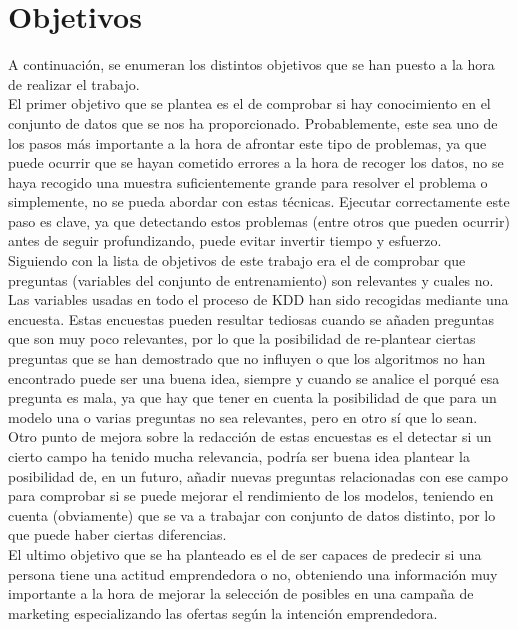 \section{Objetivos}
\label{sec:obj}
A continuación, se enumeran los distintos objetivos que se han puesto a la hora de realizar el trabajo. \\
\linebreak
El primer objetivo que se plantea es el de comprobar si hay conocimiento en el conjunto de datos que se nos ha proporcionado. Probablemente, este sea uno de los pasos más importante a la hora de afrontar este tipo de problemas, ya que puede ocurrir que se hayan cometido errores a la hora de recoger los datos, no se haya recogido una muestra suficientemente grande para resolver el problema o simplemente, no se pueda abordar con estas técnicas. Ejecutar correctamente este paso es clave, ya que detectando estos problemas (entre otros que pueden ocurrir) antes de seguir profundizando, puede evitar invertir tiempo y esfuerzo.\\
\linebreak
Siguiendo con la lista de objetivos de este trabajo era el de comprobar que preguntas (variables del conjunto de entrenamiento) son relevantes y cuales no. Las variables usadas en todo el proceso de KDD han sido recogidas mediante una encuesta. Estas encuestas pueden resultar tediosas cuando se añaden preguntas que son muy poco relevantes, por lo que la posibilidad de re-plantear ciertas preguntas que se han demostrado que no influyen o que los algoritmos no han encontrado puede ser una buena idea, siempre y cuando se analice el porqué esa pregunta es mala, ya que hay que tener en cuenta la posibilidad de que para un modelo una o varias preguntas no sea relevantes, pero en otro  sí que lo sean.\\
\linebreak
Otro punto de mejora sobre la redacción de estas encuestas es el detectar si un cierto campo ha tenido mucha relevancia, podría ser buena idea plantear la posibilidad de, en un futuro, añadir nuevas preguntas relacionadas con ese campo para comprobar si se puede mejorar el rendimiento de los modelos, teniendo en cuenta (obviamente) que se va a trabajar con conjunto de datos distinto, por lo que puede haber ciertas diferencias.\\
\linebreak
El ultimo objetivo que se ha planteado es el de ser capaces de predecir si una persona tiene una actitud emprendedora o no, obteniendo una información muy importante a la hora de mejorar la selección de posibles en una campaña de marketing especializando las ofertas según la intención emprendedora. 
\clearpage
